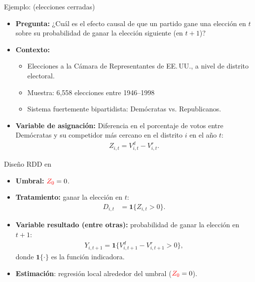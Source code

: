 \documentclass[10pt, xcolor=dvipsnames]{beamer}
\begin{document}
\begin{frame}{Ejemplo: \citet{lee_randomized_2008} (elecciones cerradas)}
\begin{itemize}
    \item \textbf{Pregunta:} ¿Cuál es el efecto causal de que un partido gane una elección en \(t\) sobre su probabilidad de ganar la elección siguiente (en \(t+1\))? %
    \vspace{1em}
    \item \textbf{Contexto:} 
    \begin{itemize}
        \item Elecciones a la Cámara de Representantes de EE.\,UU., a nivel de distrito electoral.            
        \item Muestra: 6,558 elecciones entre 1946--1998
        \item Sistema fuertemente bipartidista: Demócratas vs. Republicanos.
    \end{itemize}
    \vspace{1em}
    \item \textbf{Variable de asignación:} Diferencia en el porcentaje de votos entre Demócratas y su competidor más cercano en el distrito \(i\) en el año \(t\):
    \begin{align*}
        Z_{i,t} = V^d_{i,t} - V^r_{i,t}.
    \end{align*}
\end{itemize}
\end{frame}


\begin{frame}{Diseño RDD en \citet{lee_randomized_2008}}
\begin{itemize}
    \item \textbf{Umbral:} \(\textcolor{red}{Z_0} = 0\).
    \item \textbf{Tratamiento:} ganar la elección en \(t\):
    \vspace{-1.0em}
    \begin{align*}
        D_{i,t} &= \mathbf{1}\{Z_{i,t} > 0\}.
    \end{align*}
    \item \textbf{Variable resultado (entre otras):}  probabilidad de ganar la elección en \(t+1\): 
    \vspace{-0.25em}
    \begin{align*}
        Y_{i,t+1} = \mathbf{1}\{V^d_{i,t+1} - V^r_{i,t+1} > 0\},
    \end{align*}   
    donde \(\mathbf{1}\{\cdot\}\) es la función indicadora.
    \vspace{1em}
    \item \textbf{Estimación}: regresión local alrededor del umbral (\(\textcolor{red}{Z_0}=0\)).
\end{itemize}
\end{frame}
\end{document}
